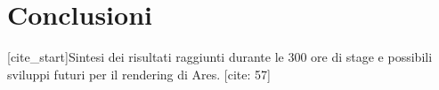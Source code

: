 \chapter*{Conclusioni}
[cite_start]Sintesi dei risultati raggiunti durante le 300 ore di stage e possibili sviluppi futuri per il rendering di Ares. [cite: 57]